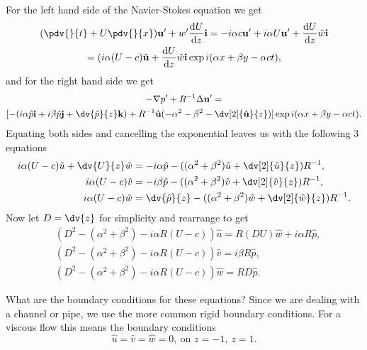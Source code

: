 For the left hand side of the Navier-Stokes equation we get
\begin{gather}
    (\pdv{}{t} + U \pdv{}{x}) \mathbf{u}' + w' \frac{\text{d}U}{\text{d}z} \mathbf{i} = -i \alpha c \mathbf{u}' + i \alpha U \mathbf{u}' + \frac{\text{d}U}{\text{d}z} \hat{w} \mathbf{i} \nonumber\\
    = (i \alpha ( U - c) \hat{\mathbf{u}} + \frac{\text{d}U}{\text{d}z} \hat{w} \mathbf{i} \exp{i(\alpha x + \beta y - \alpha c t)},
\end{gather}
and for the right hand side we get
\begin{gather}
    -\nabla p' + R^{-1} \Delta \mathbf{u}' = \nonumber\\ [-(i \alpha \hat{p} \mathbf{i} + i \beta \hat{p} \mathbf{j} + \dv{\hat{p}}{z} \mathbf{k}) + R^{-1} \hat{\mathbf{u}} (- \alpha^2 - \beta^2 - \dv[2]{\hat{\mathbf{u}}}{z})] \exp{i(\alpha x + \beta y - \alpha c t)}.
\end{gather}
Equating both sides and cancelling the exponential leaves us with the following 3 equations
\begin{subequations}
\begin{align}
    i \alpha (U - c) \hat{u} + \dv{U}{z} \hat{w} &= -i \alpha \hat{p} - ((\alpha^2 + \beta^2)\hat{u} + \dv[2]{\hat{u}}{z}) R^{-1}, \\
    i \alpha (U - c) \hat{v} &= -i \beta \hat{p} - ((\alpha^2 + \beta^2)\hat{v} + \dv[2]{\hat{v}}{z}) R^{-1}, \\
    i \alpha (U - c) \hat{w} &= \dv{\hat{p}}{z} - ((\alpha^2 + \beta^2)\hat{w} + \dv[2]{\hat{w}}{z}) R^{-1}.
\end{align}   
\end{subequations}
Now let $ D = \dv{z} $ for simplicity and rearrange to get
\begin{subequations}
\begin{align}
    &(D^2 - (\alpha^2+\beta^2) - i \alpha R (U - c)) \hat{u} = R (DU) \hat{w} + i \alpha R \hat{p}, \label{os2}\\
    &(D^2 - (\alpha^2+\beta^2) - i \alpha R (U - c)) \hat{v} = i \beta R \hat{p}, \label{os3}\\
    &(D^2 - (\alpha^2+\beta^2) - i \alpha R (U - c)) \hat{w} = R D \hat{p} \label{os4}.
\end{align} \label{oseqcomb}
\end{subequations}

What are the boundary conditions for these equations? Since we are dealing with a channel or pipe, we use the more common rigid boundary conditions. For a viscous flow this means the boundary conditions \citep{drazin2004hydrodynamic}
\begin{equation}
    \hat{u} = \hat{v} = \hat{w} = 0,\ \text{on } z = -1,\ z = 1.
    \label{viscousbc}
\end{equation}

